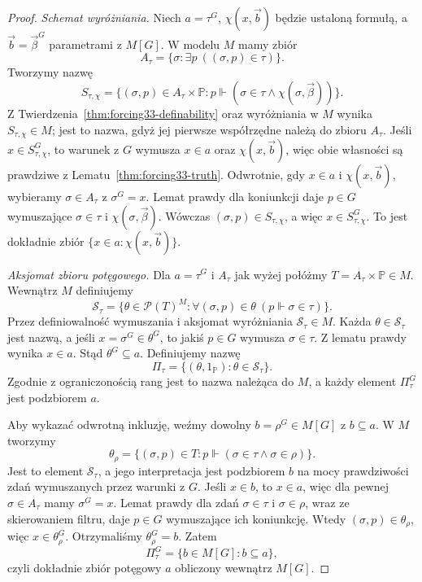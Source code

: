 \begin{proof}
\emph{Schemat wyróżniania.}
Niech $a=\tau^G$,
$\chi(x,\vec b)$ będzie ustaloną
formułą, a $\vec b=\vec\beta^G$
parametrami z $M[G]$.
W modelu $M$ mamy zbiór
\[
 A_\tau=\{\sigma:
       \exists p\ ((\sigma,p)\in\tau)\}.
\]
Tworzymy nazwę
\[
 S_{\tau,\chi}=
 \{(\sigma,p)\in A_\tau\times\mathbb P:
 p\Vdash(\sigma\in\tau
                     \land\chi(\sigma,\vec\beta))\}.
\]
Z Twierdzenia~\ref{thm:forcing33-definability}
oraz wyróżniania w $M$ wynika
$S_{\tau,\chi}\in M$; jest to nazwa,
gdyż jej pierwsze współrzędne
należą do zbioru $A_\tau$.
Jeśli $x\in S_{\tau,\chi}^G$,
to warunek z $G$ wymusza
$x\in a$ oraz $\chi(x,\vec b)$,
więc obie własności są prawdziwe
z Lematu~\ref{thm:forcing33-truth}.
Odwrotnie, gdy $x\in a$ i
$\chi(x,\vec b)$, wybieramy
$\sigma\in A_\tau$ z $\sigma^G=x$.
Lemat prawdy dla koniunkcji
daje $p\in G$ wymuszające
$\sigma\in\tau$ i $\chi(\sigma,\vec\beta)$.
Wówczas $(\sigma,p)\in S_{\tau,\chi}$,
a więc $x\in S_{\tau,\chi}^G$.
To jest dokładnie zbiór
$\{x\in a:\chi(x,\vec b)\}$.

\emph{Aksjomat zbioru potęgowego.}
Dla $a=\tau^G$ i $A_\tau$ jak wyżej
połóżmy $T=A_\tau\times\mathbb P\in M$.
Wewnątrz $M$ definiujemy
\[
 \mathcal S_\tau=
 \{\theta\in\mathcal P(T)^M:
  \forall(\sigma,p)\in\theta\
         (p\Vdash\sigma\in\tau)\}.
\]
Przez definiowalność wymuszania
i aksjomat wyróżniania
$\mathcal S_\tau\in M$.
Każda $\theta\in\mathcal S_\tau$
jest nazwą, a jeśli
$x=\sigma^G\in\theta^G$,
to jakiś $p\in G$ wymusza
$\sigma\in\tau$.
Z lematu prawdy wynika
$x\in a$. Stąd
$\theta^G\subseteq a$.
Definiujemy nazwę
\[
 \Pi_\tau=
  \{(\theta,1_{\mathbb P}):
                          \theta\in\mathcal S_\tau\}.
\]
Zgodnie z ograniczonością rang
jest to nazwa należąca do $M$,
a każdy element $\Pi_\tau^G$
jest podzbiorem $a$.

Aby wykazać odwrotną inkluzję,
weźmy dowolny
$b=\rho^G\in M[G]$ z $b\subseteq a$.
W $M$ tworzymy
\[
 \theta_\rho=
 \{(\sigma,p)\in T:
 p\Vdash(\sigma\in\tau\land\sigma\in\rho)\}.
\]
Jest to element $\mathcal S_\tau$,
a jego interpretacja jest podzbiorem
$b$ na mocy prawdziwości zdań
wymuszanych przez warunki z $G$.
Jeśli $x\in b$, to $x\in a$,
więc dla pewnej $\sigma\in A_\tau$
mamy $\sigma^G=x$. Lemat prawdy
dla zdań $\sigma\in\tau$
i $\sigma\in\rho$, wraz ze skierowaniem
filtru, daje $p\in G$ wymuszające
ich koniunkcję.
Wtedy $(\sigma,p)\in\theta_\rho$,
więc $x\in\theta_\rho^G$.
Otrzymaliśmy $\theta_\rho^G=b$.
Zatem
\[
 \Pi_\tau^G=\{b\in M[G]:b\subseteq a\},
\]
czyli dokładnie zbiór potęgowy
$a$ obliczony wewnątrz $M[G]$.


\end{proof}
